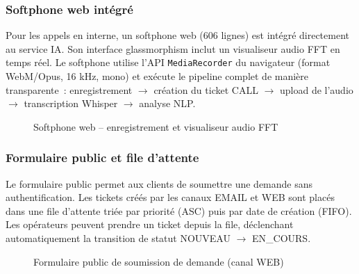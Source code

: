 \subsubsection{Softphone web int\'{e}gr\'{e}}

Pour les appels en interne, un softphone web (606 lignes) est int\'{e}gr\'{e} directement au service IA. Son interface glassmorphism inclut un visualiseur audio FFT en temps r\'{e}el. Le softphone utilise l'API \texttt{MediaRecorder} du navigateur (format WebM/Opus, 16 kHz, mono) et ex\'{e}cute le pipeline complet de mani\`{e}re transparente~: enregistrement $\rightarrow$ cr\'{e}ation du ticket CALL $\rightarrow$ upload de l'audio $\rightarrow$ transcription Whisper $\rightarrow$ analyse NLP.

\begin{figure}[H]
    \centering
    \caption{Softphone web -- enregistrement et visualiseur audio FFT}
    \label{fig:softphone}
\end{figure}

\subsubsection{Formulaire public et file d'attente}

Le formulaire public permet aux clients de soumettre une demande sans authentification. Les tickets cr\'{e}\'{e}s par les canaux EMAIL et WEB sont plac\'{e}s dans une file d'attente tri\'{e}e par priorit\'{e} (ASC) puis par date de cr\'{e}ation (FIFO). Les op\'{e}rateurs peuvent prendre un ticket depuis la file, d\'{e}clenchant automatiquement la transition de statut NOUVEAU $\rightarrow$ EN\_COURS.

\begin{figure}[H]
    \centering
    \caption{Formulaire public de soumission de demande (canal WEB)}
    \label{fig:public_form}
\end{figure}


